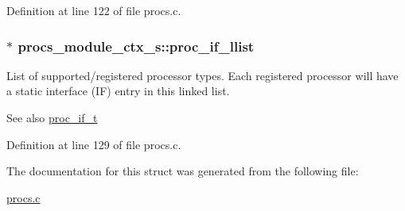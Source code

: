 Definition at line 122 of file procs.\+c.

\subsubsection[{\texorpdfstring{proc\+\_\+if\+\_\+llist}{proc_if_llist}}]{$\ast$ procs\+\_\+module\+\_\+ctx\+\_\+s\+::proc\+\_\+if\+\_\+llist}\hypertarget{structprocs__module__ctx__s_a8a7a2cc3f2ee076ae11b7fdc63645f41}{}\label{structprocs__module__ctx__s_a8a7a2cc3f2ee076ae11b7fdc63645f41}
List of supported/registered processor types. Each registered processor will have a static interface (IF) entry in this linked list. \begin{DoxySeeAlso}{See also}
\hyperlink{proc__if_8h_a2b6dbff97f4d62e7a7c7674284620929}{proc\+\_\+if\+\_\+t} 
\end{DoxySeeAlso}


Definition at line 129 of file procs.\+c.



The documentation for this struct was generated from the following file\+:\begin{DoxyCompactItemize}
\item 
\hyperlink{procs_8c}{procs.\+c}\end{DoxyCompactItemize}
